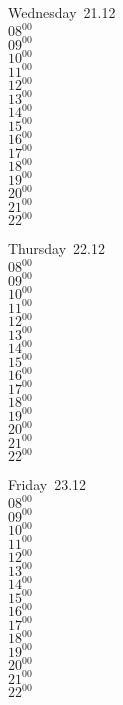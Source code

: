 \documentclass[11pt,a4paper]{book}\usepackage[]{graphicx}\usepackage[]{color}
\begin{document}
\begin{weekdaybox}
  Wednesday~21.12\\
  { 
  \vfill
  $08^{00}$\\
$09^{00}$\\
$10^{00}$\\
$11^{00}$\\
$12^{00}$\\
$13^{00}$\\
$14^{00}$\\
$15^{00}$\\
$16^{00}$\\
$17^{00}$\\
$18^{00}$\\
$19^{00}$\\
$20^{00}$\\
$21^{00}$\\
$22^{00}$\\
  }
\end{weekdaybox}
\clearpage
\begin{headerbox}
\end{headerbox}
\begin{weekdaybox}
  Thursday~22.12\\
  { 
  \vfill
  $08^{00}$\\
$09^{00}$\\
$10^{00}$\\
$11^{00}$\\
$12^{00}$\\
$13^{00}$\\
$14^{00}$\\
$15^{00}$\\
$16^{00}$\\
$17^{00}$\\
$18^{00}$\\
$19^{00}$\\
$20^{00}$\\
$21^{00}$\\
$22^{00}$\\
  }
\end{weekdaybox} 
\begin{weekdaybox}
  Friday~23.12\\
  { 
  \vfill
  $08^{00}$\\
$09^{00}$\\
$10^{00}$\\
$11^{00}$\\
$12^{00}$\\
$13^{00}$\\
$14^{00}$\\
$15^{00}$\\
$16^{00}$\\
$17^{00}$\\
$18^{00}$\\
$19^{00}$\\
$20^{00}$\\
$21^{00}$\\
$22^{00}$\\
  }
\end{weekdaybox}
\end{document}

